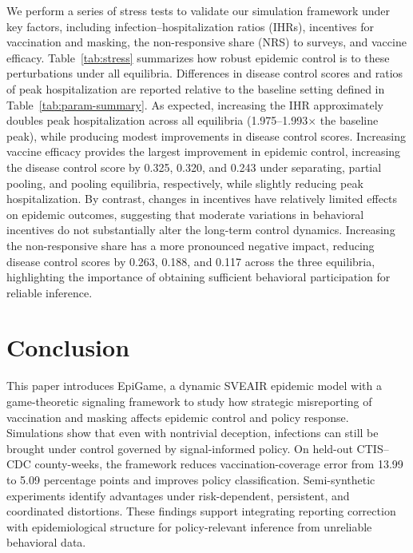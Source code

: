 \documentclass[sigconf,review]{acmart}
\newcommand{\model}{EpiGame}
\begin{document}
We perform a series of stress tests to validate our simulation framework under key factors, including infection–hospitalization ratios (IHRs), incentives for vaccination and masking, the non-responsive share (NRS) to surveys, and vaccine efficacy. Table~\ref{tab:stress} summarizes how robust epidemic control is to these perturbations under all equilibria. Differences in disease control scores and ratios of peak hospitalization are reported relative to the baseline setting defined in Table~\ref{tab:param-summary}. As expected, increasing the IHR approximately doubles peak hospitalization across all equilibria (1.975--1.993$\times$ the baseline peak), while producing modest improvements in disease control scores. Increasing vaccine efficacy provides the largest improvement in epidemic control, increasing the disease control score by 0.325, 0.320, and 0.243 under separating, partial pooling, and pooling equilibria, respectively, while slightly reducing peak hospitalization. By contrast, changes in incentives have relatively limited effects on epidemic outcomes, suggesting that moderate variations in behavioral incentives do not substantially alter the long-term control dynamics. Increasing the non-responsive share has a more pronounced negative impact, reducing disease control scores by 0.263, 0.188, and 0.117 across the three equilibria, highlighting the importance of obtaining sufficient behavioral participation for reliable inference. %


\section{Conclusion}
This paper introduces \model{}, a dynamic SVEAIR epidemic model with a game-theoretic signaling framework to study how strategic misreporting of vaccination and masking affects epidemic control and policy response. 
Simulations show that even with nontrivial deception, infections can still be brought under control governed by signal-informed policy. 
On held-out CTIS--CDC county-weeks, the framework reduces vaccination-coverage error from 13.99 to 5.09 percentage points and improves policy classification. 
Semi-synthetic experiments identify advantages under risk-dependent, persistent, and coordinated distortions. 
These findings support integrating reporting correction with epidemiological structure for policy-relevant inference from unreliable behavioral data.
\end{document}
